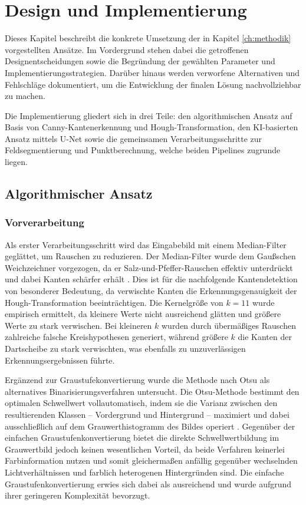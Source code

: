 \chapter{Design und Implementierung}

Dieses Kapitel beschreibt die konkrete Umsetzung der in Kapitel \ref{ch:methodik} vorgestellten Ansätze. Im Vordergrund stehen dabei die getroffenen Designentscheidungen sowie die Begründung der gewählten Parameter und Implementierungsstrategien. Darüber hinaus werden verworfene Alternativen und Fehlschläge dokumentiert, um die Entwicklung der finalen Lösung nachvollziehbar zu machen.

Die Implementierung gliedert sich in drei Teile: den algorithmischen Ansatz auf Basis von Canny-Kantenerkennung und Hough-Transformation, den KI-basierten Ansatz mittels U-Net sowie die gemeinsamen Verarbeitungsschritte zur Feldsegmentierung und Punktberechnung, welche beiden Pipelines zugrunde liegen.

\section{Algorithmischer Ansatz}

\subsection{Vorverarbeitung}

Als erster Verarbeitungsschritt wird das Eingabebild mit einem Median-Filter geglättet, um Rauschen zu reduzieren. Der Median-Filter wurde dem Gaußschen Weichzeichner vorgezogen, da er Salz-und-Pfeffer-Rauschen effektiv unterdrückt 
und dabei Kanten schärfer erhält \cite{opencv_blur}. Dies ist für die nachfolgende Kantendetektion von besonderer Bedeutung, da verwischte Kanten die Erkennungsgenauigkeit der Hough-Transformation beeinträchtigen. Die Kernelgröße von $k = 11$ wurde empirisch ermittelt, da kleinere Werte nicht ausreichend glätten und größere Werte zu stark verwischen. Bei kleineren $k$ wurden durch übermäßiges Rauschen zahlreiche falsche Kreishypothesen generiert, während größere $k$ die Kanten der Dartscheibe zu stark verwischten, was ebenfalls zu unzuverlässigen Erkennungsergebnissen führte.

Ergänzend zur Graustufekonvertierung wurde die Methode nach Otsu \cite{otsu-method} als alternatives Binarisierungsverfahren untersucht. Die Otsu-Methode bestimmt den optimalen Schwellwert vollautomatisch, indem sie die Varianz zwischen den resultierenden Klassen -- Vordergrund und Hintergrund -- maximiert und dabei ausschließlich auf dem Grauwerthistogramm des Bildes operiert \cite{otsu-method}. Gegenüber der einfachen Graustufenkonvertierung bietet die direkte Schwellwertbildung im Grauwertbild jedoch keinen wesentlichen Vorteil, da beide Verfahren keinerlei Farbinformation nutzen und somit gleichermaßen anfällig gegenüber wechselnden Lichtverhältnissen und farblich heterogenen Hintergründen sind. Die einfache Graustufenkonvertierung erwies sich dabei als ausreichend und wurde aufgrund ihrer geringeren Komplexität bevorzugt.

